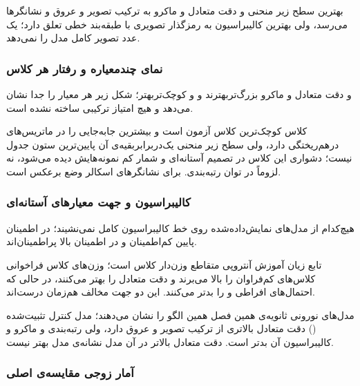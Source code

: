 



بهترین سطح زیر منحنی و دقت متعادل و  ماکرو به ترکیب تصویر و عروق و نشانگرها می‌رسد، ولی بهترین کالیبراسیون به رمزگذار تصویری با طبقه‌بند خطی تعلق دارد؛ یک عدد تصویر کامل مدل را نمی‌دهد.

\subsubsection{نمای چندمعیاره و رفتار هر کلاس}

 و دقت متعادل و  ماکرو بزرگ‌تر‌بهترند و  و  کوچک‌تر‌بهتر؛ شکل زیر هر معیار را جدا نشان می‌دهد و هیچ امتیاز ترکیبی ساخته نشده است.







کلاس  کوچک‌ترین کلاس آزمون است و بیشترین جابه‌جایی را در ماتریس‌های درهم‌ریختگی دارد، ولی سطح زیر منحنی یک‌دربرابر‌بقیه‌ی آن پایین‌ترین ستون جدول نیست؛ دشواری این کلاس در تصمیم آستانه‌ای و شمار کم نمونه‌هایش دیده می‌شود، نه لزوماً در توان رتبه‌بندی. برای نشانگرهای اسکالر وضع برعکس است.

\subsubsection{کالیبراسیون و جهت معیارهای آستانه‌ای}

هیچ‌کدام از مدل‌های نمایش‌داده‌شده روی خط کالیبراسیون کامل نمی‌نشیند؛ در اطمینان پایین کم‌اطمینان و در اطمینان بالا پراطمینان‌اند.



تابع زیان آموزش آنتروپی متقاطع وزن‌دار کلاس است؛ وزن‌های کلاس فراخوانی کلاس‌های کم‌فراوان را بالا می‌برند و دقت متعادل را بهتر می‌کنند، در حالی که احتمال‌های افراطی  و  را بدتر می‌کنند. این دو جهت مخالف هم‌زمان درست‌اند.

مدل‌های نورونی ثانویه‌ی همین فصل همین الگو را نشان می‌دهند؛ مدل کنترل تثبیت‌شده () دقت متعادل بالاتری از ترکیب تصویر و عروق دارد، ولی رتبه‌بندی و  ماکرو و کالیبراسیون آن بدتر است. دقت متعادل بالاتر در آن مدل نشانه‌ی مدل بهتر نیست.

\subsubsection{آمار زوجی مقایسه‌ی اصلی}

